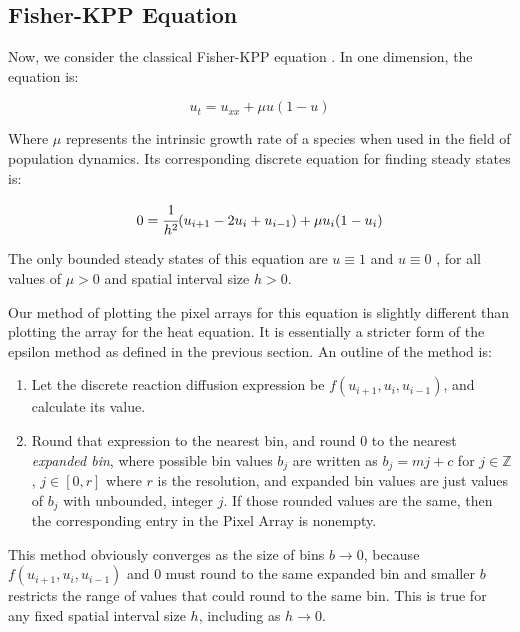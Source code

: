 \documentclass[11pt]{article}
\begin{document}
\subsection{Fisher-KPP Equation}\label{sec:Fisher}

Now, we consider the classical Fisher-KPP equation \citep{Fisher}. In one dimension, the equation is:

\begin{equation}
    \label{Fisher}
    u_t = u_{xx} + \mu u (1-u)
\end{equation}

\noindent Where $\mu$ represents the intrinsic growth rate of a species \citep{Numerical_RD_1} when used in the field of population dynamics. Its corresponding discrete equation for finding steady states is:

\begin{equation}
    \label{discrete Fisher}
    0 = \cfrac{1}{h^2} (u_{i+1} - 2u_i + u_{i-1}) + \mu u_i (1-u_i)
\end{equation}

\noindent The only bounded steady states of this equation are $u \equiv 1$ and $u \equiv 0$ \citep{Fisher}, for all values of $\mu > 0$ and spatial interval size $h > 0$.

Our method of plotting the pixel arrays for this equation is slightly different than plotting the array for the heat equation. It is essentially a stricter form of the epsilon method as defined in the previous section. An outline of the method is:

\begin{enumerate}
    \item Let the discrete reaction diffusion expression be $f(u_{i+1}, u_i, u_{i-1})$, and calculate its value.
    \item  Round that expression to the nearest bin, and round 0 to the nearest \emph{expanded bin}, where possible bin values $b_j$ are written as $b_j = mj + c$ for $j \in \mathbb{Z}$, $j \in [0,r]$ where $r$ is the resolution, and expanded bin values are just values of $b_j$ with unbounded, integer $j$. If those rounded values are the same, then the corresponding entry in the Pixel Array is nonempty.
\end{enumerate}

This method obviously converges as the size of bins $b \rightarrow 0$, because $f(u_{i+1}, u_i, u_{i-1})$ and 0 must round to the same expanded bin and smaller $b$ restricts the range of values that could round to the same bin. This is true for any fixed spatial interval size $h$, including as $h \rightarrow 0$.
\end{document}
